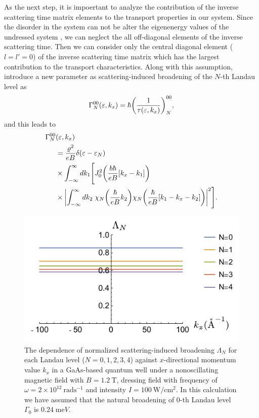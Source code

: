 As the next step, it is impoertant to analyze the contribution of the inverse scattering time matrix elements to the transport properties in our system.
Since the disorder in the system can not be alter the eigenenergy values of the undressed system \cite{wackerl20}, we can neglect the all off-diagonal elements of the inverse scattering time. Then we can consider only the central diagonal element (${l=l'=0}$) of the inverse scattering time matrix which has the largest contribution to the transport characteristics. Along with this assumption, introduce a new parameter as scattering-induced broadening of the $N$-th Landau level as \cite{dini16,endo09}
\begin{equation} \label{eq_14}
 \Gamma^{00}_{N}(\varepsilon,k_x) = \hbar \qty(\frac{1}{\tau(\varepsilon,k_x)})^{00}_{N},
\end{equation}
and this leads to
\begin{equation} \label{eq_15}
 \begin{aligned}
   \Gamma^{00}_{N}& (\varepsilon,k_x) \\
   & =
   \frac { \varrho^2}{eB}
   \delta(\varepsilon - \varepsilon_{N}) \\
   & \times
   \int_{-\infty}^{\infty} d k_1 \Bigg[
   J_0^2\qty(\frac{b\hbar}{eB}[{k}_x - k_1])
   \\
   & \times
   \qty|
   \int_{-\infty}^{\infty} dk_2 \;
   {\chi}_{N}\qty(\frac{\hbar}{eB}k_2)
   {\chi}_{N}\qty(\frac{\hbar}{eB} \qty[k_1 - {k}_x - k_2])|^2\Bigg].
 \end{aligned}
\end{equation}

\begin{figure}[t]
\includegraphics[scale=0.68]{figures/fig_3}
\caption{\label{fig_3} The dependence of normalized scattering-induced broadening $\Lambda_N$ for each Landau level ($N =0,1,2,3,4$) against $x$-directional momentum value $k_x$ in a GaAs-based quantum well under a nonoscillating magnetic field with $B = 1.2~\text{T}$, dressing field with frequency of $\omega =2\times10^{12}~\text{rad}\text{s}^{-1}$ and intensity $I =100~\text{W}/\text{cm}^{2}$.
In this calculation we have assumed that the natural  broadening of $0$-th Landau level $\Gamma_0$ is $0.24\;\text{me}V$.}
\end{figure}

